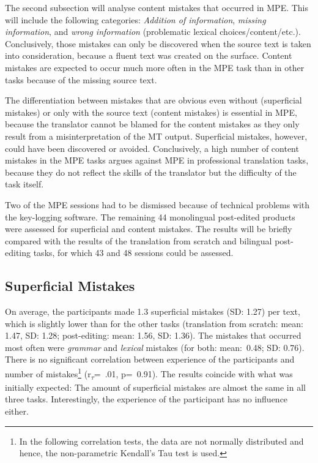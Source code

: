 \documentclass[output=paper]{langsci/langscibook}
\begin{document}
The second subsection will analyse content mistakes that occurred in MPE. This will include the following categories: \textit{Addition of information}, \textit{missing information}, and \textit{wrong information} (problematic lexical choices/content/etc.). Conclusively, those mistakes can only be discovered when the source text is taken into consideration, because a fluent text was created on the surface. Content mistakes are expected to occur much more often in the MPE task than in other tasks because of the missing source text.



The differentiation between mistakes that are obvious even without (superficial mistakes) or only with the source text (content mistakes) is essential in MPE, because the translator cannot be blamed for the content mistakes as they only result from a misinterpretation of the MT output. Superficial mistakes, however, could have been discovered or avoided. Conclusively, a high number of content mistakes in the MPE tasks argues against MPE in professional translation tasks, because they do not reflect the skills of the translator but the difficulty of the task itself.



Two of the MPE sessions had to be dismissed because of technical problems with the key-logging software. The remaining 44 monolingual post-edited products were assessed for superficial and content mistakes. The results will be briefly compared with the results of the translation from scratch and bilingual post-editing tasks, for which 43 and 48 sessions could be assessed.


\subsection{Superficial Mistakes\label{nitzke:sec:SuperficialMistakes}}

On average, the participants made 1.3 superficial mistakes (SD: 1.27) per text, which is slightly lower than for the other tasks (translation from scratch: mean: 1.47, SD: 1.28; post-editing: mean: 1.56, SD: 1.36). The mistakes that occurred most often were \textit{grammar} and \textit{lexical} mistakes (for both: mean:~0.48; SD: 0.76). There is no significant correlation between experience of the participants and number of mistakes\footnote{In the following correlation tests, the data are not normally distributed and hence, the non-parametric Kendall's Tau test is used.} (r\textsubscript{$\tau $}=~.01, p=~0.91). The results coincide with what was initially expected: The amount of superficial mistakes are almost the same in all three tasks. Interestingly, the experience of the participant has no influence either.
\end{document}
